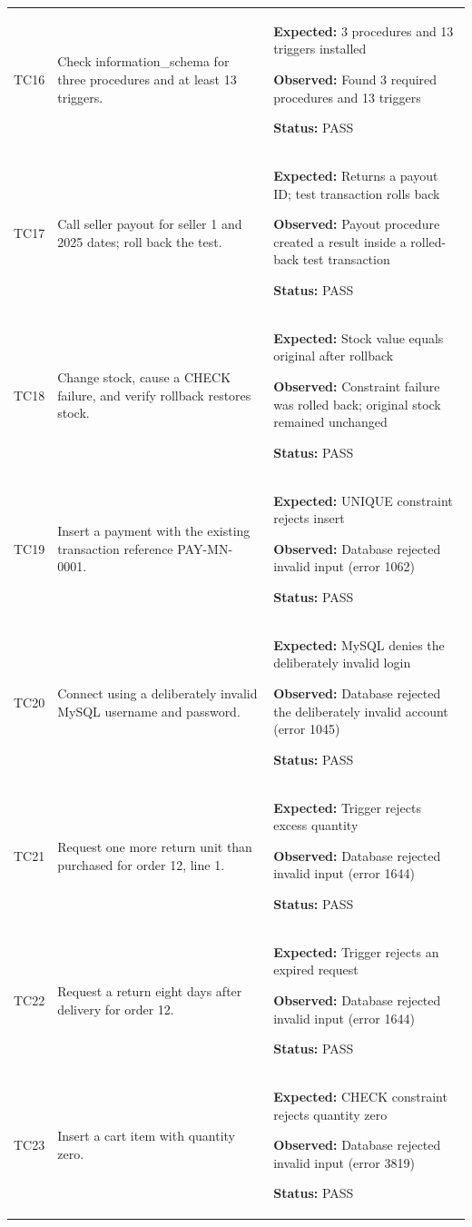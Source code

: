 \documentclass[11pt,a4paper,oneside]{report}
\begin{document}
\begin{longtable}{@{}P{13mm}P{51mm}P{92mm}@{}}
TC16 & Check information\_schema for three procedures and at least 13 triggers. & \textbf{Expected:} 3 procedures and 13 triggers installed\par\textbf{Observed:} Found 3 required procedures and 13 triggers\par\textbf{Status:} PASS \\
TC17 & Call seller payout for seller 1 and 2025 dates; roll back the test. & \textbf{Expected:} Returns a payout ID; test transaction rolls back\par\textbf{Observed:} Payout procedure created a result inside a rolled-back test transaction\par\textbf{Status:} PASS \\
TC18 & Change stock, cause a CHECK failure, and verify rollback restores stock. & \textbf{Expected:} Stock value equals original after rollback\par\textbf{Observed:} Constraint failure was rolled back; original stock remained unchanged\par\textbf{Status:} PASS \\
TC19 & Insert a payment with the existing transaction reference PAY-MN-0001. & \textbf{Expected:} UNIQUE constraint rejects insert\par\textbf{Observed:} Database rejected invalid input (error 1062)\par\textbf{Status:} PASS \\
TC20 & Connect using a deliberately invalid MySQL username and password. & \textbf{Expected:} MySQL denies the deliberately invalid login\par\textbf{Observed:} Database rejected the deliberately invalid account (error 1045)\par\textbf{Status:} PASS \\
TC21 & Request one more return unit than purchased for order 12, line 1. & \textbf{Expected:} Trigger rejects excess quantity\par\textbf{Observed:} Database rejected invalid input (error 1644)\par\textbf{Status:} PASS \\
TC22 & Request a return eight days after delivery for order 12. & \textbf{Expected:} Trigger rejects an expired request\par\textbf{Observed:} Database rejected invalid input (error 1644)\par\textbf{Status:} PASS \\
TC23 & Insert a cart item with quantity zero. & \textbf{Expected:} CHECK constraint rejects quantity zero\par\textbf{Observed:} Database rejected invalid input (error 3819)\par\textbf{Status:} PASS \\

\end{longtable}
\end{document}
